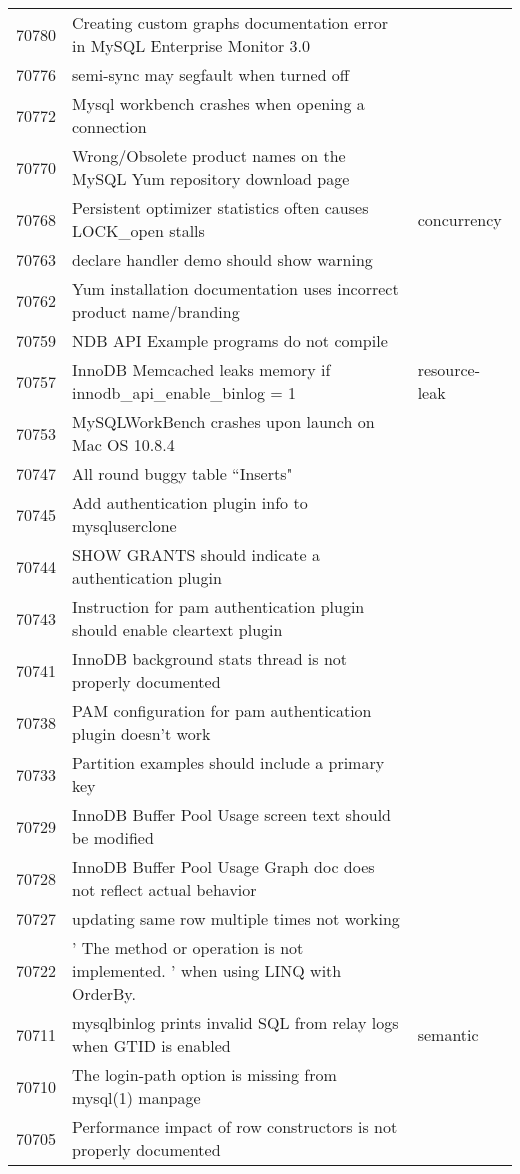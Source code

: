 \begin{longtable}[c]{p{1cm}p{10cm}p{1cm}}
70780 & Creating custom graphs documentation error in MySQL Enterprise Monitor 3.0 &  \\
70776 & semi-sync may segfault when turned off &  \\
70772 & Mysql workbench crashes when opening a connection &  \\
70770 & Wrong/Obsolete product names on the MySQL Yum repository download page &  \\
70768 & Persistent optimizer statistics often causes LOCK\_open stalls & concurrency \\
70763 & declare handler demo should show warning &  \\
70762 & Yum installation documentation uses incorrect product name/branding &  \\
70759 & NDB API Example programs do not compile &  \\
70757 & InnoDB Memcached leaks memory if innodb\_api\_enable\_binlog = 1 & resource-leak \\
70753 & MySQLWorkBench crashes upon launch on Mac OS 10.8.4 &  \\
70747 & All round buggy table ``Inserts" &  \\
70745 & Add authentication plugin info to mysqluserclone &  \\
70744 & SHOW GRANTS should indicate a authentication plugin &  \\
70743 & Instruction for pam authentication plugin should enable cleartext plugin &  \\
70741 & InnoDB background stats thread is not properly documented &  \\
70738 & PAM configuration for pam authentication plugin doesn't work &  \\
70733 & Partition examples should include a primary key &  \\
70729 & InnoDB Buffer Pool Usage screen text should be modified &  \\
70728 & InnoDB Buffer Pool Usage Graph doc does not reflect actual behavior &  \\
70727 & updating same row multiple times not working &  \\
70722 & ' The method or operation is not implemented. ' when using LINQ with OrderBy. &  \\
70711 & mysqlbinlog prints invalid SQL from relay logs when GTID is enabled & semantic \\
70710 & The login-path option is missing from mysql(1) manpage &  \\
70705 & Performance impact of row constructors is not properly documented &  \\

\end{longtable}
